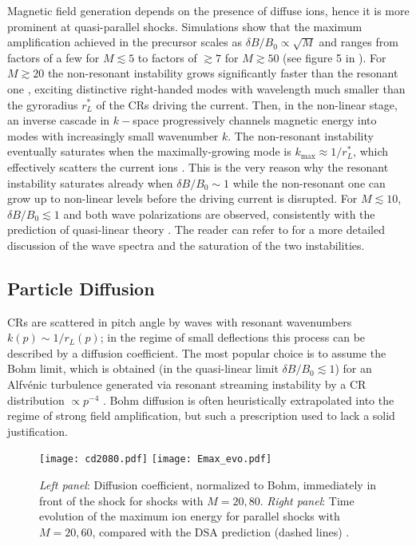 \documentclass[varenna]{cimento}
\begin{document}
Magnetic field generation depends on the presence of diffuse ions, hence it is more prominent at quasi-parallel shocks.
Simulations show that the maximum amplification achieved in the precursor scales as $\delta B/B_0\propto\sqrt{M}$ and ranges from factors of a few for $M\lesssim 5$ to factors of $\gtrsim 7$ for $M\gtrsim 50$ (see  figure 5 in \cite{caprioli+14b}).
For $M\gtrsim 20$ the non-resonant instability grows significantly faster than the resonant one \cite{riquelme+09,gargate+10}, exciting distinctive right-handed modes with wavelength much smaller than the gyroradius $r^*_L$ of the CRs driving the current.
Then, in the non-linear stage, an inverse cascade in $k-$space progressively channels magnetic energy into modes with increasingly small wavenumber $k$. 
The non-resonant instability eventually saturates when the maximally-growing mode is $k_{\max} \approx 1/r^*_L$, which effectively scatters the current ions \cite{zacharegkas+22}.
This is the very reason why the resonant instability saturates already when $\delta B/B_0\sim1$ \cite{mckenzie+82} while the non-resonant one can grow up to non-linear levels before the driving current is disrupted.
For $M\lesssim 10$, $\delta B/B_0\lesssim1$ and both wave polarizations are observed, consistently with the prediction of quasi-linear theory \cite{amato+09}.
The reader can refer to \cite{caprioli+14b} for a more detailed discussion of the wave spectra and the saturation of the two instabilities.

\subsection{\label{sec:diff}Particle Diffusion}
CRs are scattered in pitch angle by waves with resonant wavenumbers $k(p)\sim 1/r_L(p)$; in the regime of small deflections this process can be described by a diffusion coefficient. 
The most popular choice is to assume the Bohm limit, which is obtained (in the quasi-linear limit $\delta B/B_0\lesssim 1$) for an Alfv\'enic turbulence generated via resonant streaming instability by a CR distribution $\propto p^{-4}$ \cite{bell78a}.
Bohm diffusion is often heuristically extrapolated into the regime of strong field amplification, but such a prescription used to lack a solid justification.  

\begin{figure}\centering
\texttt{[image: cd2080.pdf]}
\texttt{[image: Emax\_evo.pdf]}
\caption{\label{fig:cd}
{\emph{Left panel}: Diffusion coefficient, normalized to Bohm, immediately in front of the shock for  shocks with $M=20, 80$.
\emph{Right panel}: Time evolution of the maximum ion energy for parallel shocks with $M=20,60$, compared with the DSA prediction  (dashed lines) \cite{caprioli+14c}.}
}
\vspace{-0.5cm}
\end{figure}
\end{document}
